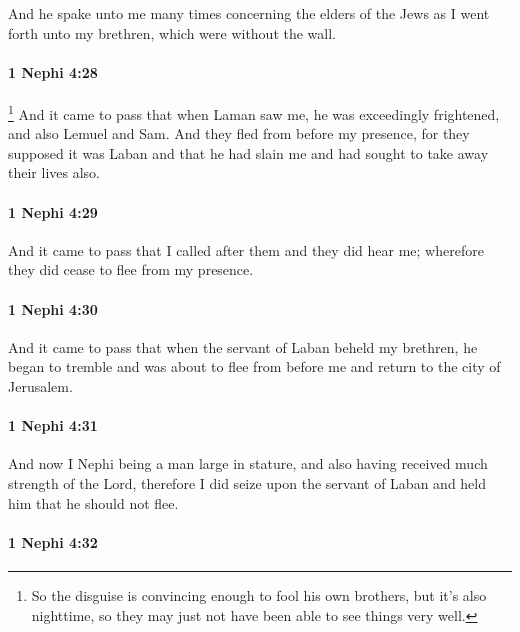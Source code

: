 			And he spake unto me many times concerning the elders of the Jews
			as I went forth unto my brethren, which were without the wall.

		\paragraph{1 Nephi 4:28} %
			\label{1NEPHI-4-28}

				\footnote{%
					So the disguise is convincing enough to fool his own brothers, but it's also nighttime, so they may just not have been able to see things very well.
					}%
			And it came to pass that when Laman saw me,
			he was exceedingly frightened, and also Lemuel and Sam.
			And they fled from before my presence,
			for they supposed it was Laban
			and that he had slain me and had sought to take away their lives also.

		\paragraph{1 Nephi 4:29} %
			\label{1NEPHI-4-29}

			And it came to pass that I called after them and they did hear me;
			wherefore they did cease to flee from my presence.

		\paragraph{1 Nephi 4:30} %
			\label{1NEPHI-4-30}

			And it came to pass that when the servant of Laban beheld my brethren,
			he began to tremble and was about to flee from before me
			and return to the city of Jerusalem.

		\paragraph{1 Nephi 4:31} %
			\label{1NEPHI-4-31}

			And now I Nephi being a man large in stature,
			and also having received much strength of the Lord,
			therefore I did seize upon the servant of Laban
			and held him that he should not flee.

		\paragraph{1 Nephi 4:32} %
			\label{1NEPHI-4-32}

